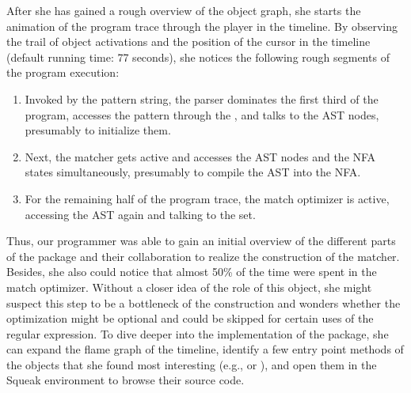 After she has gained a rough overview of the object graph, she starts the animation of the program trace through the player in the timeline.
By observing the trail of object activations and the position of the cursor in the timeline (default running time: 77 seconds), she notices the following rough segments of the program execution:

\begin{enumerate}
	\item Invoked by the pattern string, the parser dominates the first third of the program, accesses the pattern through the , and talks to the AST nodes, presumably to initialize them.
	\item Next, the matcher gets active and accesses the AST nodes and the NFA states simultaneously, presumably to compile the AST into the NFA.
	\item For the remaining half of the program trace, the match optimizer is active, accessing the AST again and talking to the set.
\end{enumerate}

Thus, our programmer was able to gain an initial overview of the different parts of the  package and their collaboration to realize the construction of the matcher.
Besides, she also could notice that almost 50\si{\percent} of the time were spent in the match optimizer.
Without a closer idea of the role of this object, she might suspect this step to be a bottleneck of the construction and wonders whether the optimization might be optional and could be skipped for certain uses of the regular expression.
To dive deeper into the implementation of the  package, she can expand the flame graph of the timeline, identify a few entry point methods of the objects that she found most interesting (e.g.,  or ), and open them in the Squeak environment to browse their source code.

